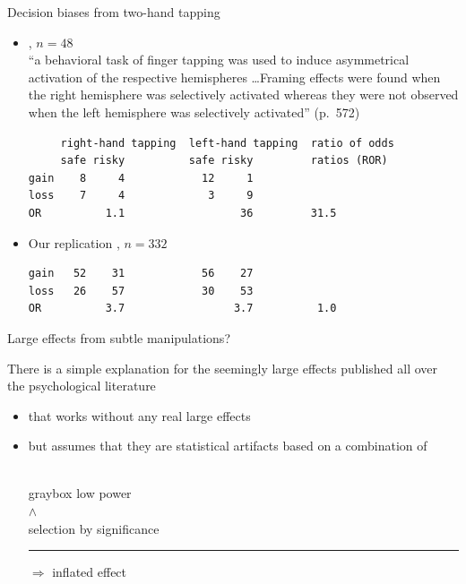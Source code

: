 \documentclass[aspectratio=169]{beamer}
\newenvironment{colbox}[1][\textwidth]%
  {\begin{beamercolorbox}[wd=#1, rounded=true, shadow=true]{graybox}}
  {\end{beamercolorbox}}
\begin{document}
\begin{frame}[fragile]{Decision biases from two-hand tapping}

\begin{itemize}
\item \citet{McElroySeta04}, $n = 48$\\[1ex]

``a behavioral task of finger tapping was used to induce asymmetrical
activation of the respective hemispheres \dots Framing effects were found when
the right hemisphere was selectively activated whereas they were not observed
when the left hemisphere was selectively activated'' (p.~572)

\begin{lstlisting}
     right-hand tapping  left-hand tapping  ratio of odds
     safe risky          safe risky         ratios (ROR)
gain    8     4            12     1
loss    7     4             3     9
OR          1.1                  36         31.5
\end{lstlisting}

\item Our replication \citep[see][]{Gelman20}, $n = 332$
\begin{lstlisting}
gain   52    31            56    27
loss   26    57            30    53
OR          3.7                 3.7          1.0
\end{lstlisting}
\end{itemize}

\end{frame}


\begin{frame}{Large effects from subtle manipulations?}

There is a simple explanation for the seemingly large effects published all
over the psychological literature\\[2ex]

\begin{itemize}
\item that works without any real large effects

\item but assumes that they are statistical artifacts based on a combination
of\\[2ex]

~\hfill\begin{colbox}[5cm]
\centering
low power\\
$\wedge$\\
selection by significance\\[1ex]
\hrule\vspace{1ex}
$\Rightarrow$ inflated effect
\end{colbox}\hfill~

\vspace{2ex}

\citep[type M error;][]{GelmanCarlin14}
\end{itemize}

\end{frame}
\end{document}
